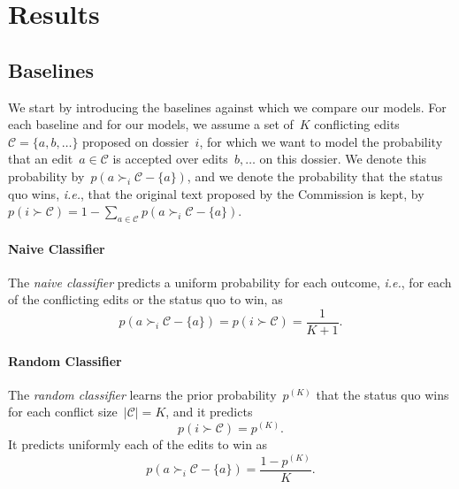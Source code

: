 \section{Results}
\label{sec:results}

\subsection{Baselines}

We start by introducing the baselines against which we compare our models.
For each baseline and for our models, we assume a set of~$K$ conflicting edits \mbox{$\mathcal{C} = \{ a, b, \ldots \}$} proposed on dossier~$i$, for which we want to model the probability that an edit~$a \in \mathcal{C}$ is accepted over edits~$b, \ldots$ on this dossier.
We denote this probability by~$p\left( a \succ_i \mathcal{C} - \{ a\} \right)$, and we denote the probability that the status quo wins, \textit{i.e.}, that the original text proposed by the Commission is kept, by~$p\left( i \succ \mathcal{C} \right) = 1 - \sum_{a\in \mathcal{C}} p\left( a \succ_i \mathcal{C} - \{a\} \right)$.

\paragraph{Naive Classifier}

The \textit{naive classifier} predicts a uniform probability for each outcome, \textit{i.e.}, for each of the conflicting edits or the status quo to win, as
\begin{equation*}
	p\left( a \succ_i \mathcal{C} - \{ a\} \right) = p\left( i \succ \mathcal{C} \right) = \frac{1}{K + 1}.
\end{equation*}

\paragraph{Random Classifier}

The \textit{random classifier} learns the prior probability~$p^{(K)}$ that the status quo wins for each conflict size~$\vert \mathcal{C} \vert = K$, and it predicts
\begin{equation*}
	p\left( i \succ \mathcal{C} \right) = p^{(K)}.
\end{equation*}
It predicts uniformly each of the edits to win as
\begin{equation*}
	p\left( a \succ_i \mathcal{C} - \{ a\} \right) = \frac{1-p^{(K)}}{K}.
\end{equation*}

